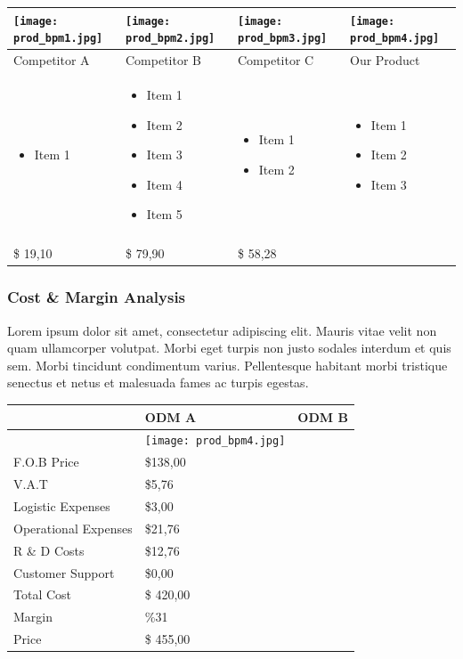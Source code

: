 \documentclass[11pt,titlepage]{article}
\begin{document}
\begin{tabular}{| m{92 pt} | m{92 pt} | m{92 pt} | m{92 pt} |}\hline
  \texttt{[image: prod\_bpm1.jpg]} & 
  \texttt{[image: prod\_bpm2.jpg]} & 
  \texttt{[image: prod\_bpm3.jpg]} & 
  \texttt{[image: prod\_bpm4.jpg]} \\ \hline
  Competitor A & Competitor B & Competitor C & Our Product\\ \hline
  \begin{itemize} \tiny \item Item 1 \end{itemize} & 
  \begin{itemize} \tiny 
  \item Item 1
  \item Item 2
  \item Item 3
  \item Item 4
  \item Item 5\end{itemize} & 
    \begin{itemize} \tiny 
    \item Item 1
    \item Item 2\end{itemize}& 
      \begin{itemize} \tiny 
      \item Item 1
      \item Item 2
      \item Item 3 \end{itemize} \\
      & & & \\ \hline
      \$ 19,10 & \$ 79,90 & \$ 58,28 & \\ \hline
\end{tabular}

\subsubsection{Cost \& Margin Analysis}
Lorem ipsum dolor sit amet, consectetur adipiscing elit. Mauris vitae velit 
non quam ullamcorper volutpat. Morbi eget turpis non justo sodales interdum 
et quis sem. Morbi tincidunt condimentum varius. Pellentesque habitant morbi 
tristique senectus et netus et malesuada fames ac turpis egestas.\newline
\begin{tabular}{ | l | l | l | }\hline
  & ODM A & ODM B \\ \hline
  & \texttt{[image: prod\_bpm4.jpg]} 
	&  \\ \hline
  F.O.B Price & \$138,00 &  \\ \hline
  V.A.T & \$5,76 &  \\ \hline
  Logistic Expenses & \$3,00 & \\ \hline
  Operational Expenses & \$21,76 & \\ \hline
  R \& D Costs & \$12,76 &  \\ \hline
  Customer Support & \$0,00 &  \\ \hline
  Total Cost & \$ 420,00 &  \\ \hline
  Margin & \%31 &  \\ \hline
  Price & \$ 455,00 &  \\ \hline
\end{tabular}
\pagebreak
\end{document}
